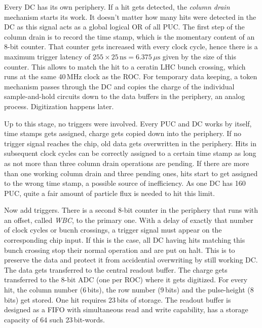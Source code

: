 Every \gls{DC} has its own periphery. If a hit gets detected, the \emph{column drain} mechanism starts its work. It doesn't matter how many hits were detected in the \gls{DC} as this signal acts as a global logical OR of all \gls{PUC}. The first step of the column drain is to record the time stamp, which is the momentary content of an 8-bit counter. That counter gets increased with every clock cycle, hence there is a maximum trigger latency of $255\times25\,\text{ns}=6.375\,\mu\text{s}$ given by the size of this counter. This allows to match the hit to a ceratin LHC bunch crossing, which runs at the same 40\,MHz clock as the \gls{ROC}. For temporary data keeping, a token mechanism passes through the \gls{DC} and copies the charge of the individual sample-and-hold circuits down to the data buffers in the periphery, an analog process. Digitization happens later.

Up to this stage, no triggers were involved. Every \gls{PUC} and \gls{DC} works by itself, time stamps gets assigned, charge gets copied down into the periphery. If no trigger signal reaches the chip, old data gets overwritten in the periphery. Hits in subsequent clock cycles can be correctly assigned to a certain time stamp as long as not more than three column drain operations are pending. If there are more than one working column drain and three pending ones, hits start to get assigned to the wrong time stamp, a possible source of inefficiency. As one \gls{DC} has 160\,\gls{PUC}, quite a fair amount of particle flux is needed to hit this limit.

Now add triggers. There is a second 8-bit counter in the periphery that runs with an offset, called \emph{WBC}, to the primary one. With a delay of exactly that number of clock cycles or bucnh crossings, a trigger signal must appear on the corresponding chip input. If this is the case, all \gls{DC} having hits matching this bunch crossing stop their normal operation and are put on halt. This is to preserve the data and protect it from accidential overwriting by still working \gls{DC}. The data gets transferred to the central readout buffer. The charge gets transferred to the 8-bit ADC (one per \gls{ROC}) where it gets digitized. For every hit, the column number (6\,bits), the row number (9\,bits) and the pulse-height (8\,bits) get stored. One hit requires 23\,bits of storage. The readout buffer is designed as a FIFO with simultaneous read and write capability, has a storage capacity of 64 such 23\,bit-words.

